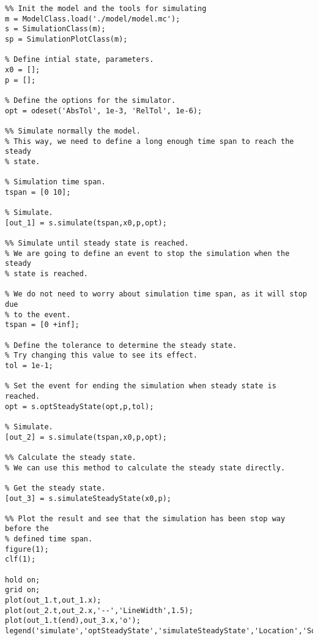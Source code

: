 \documentclass[11pt]{article}
\begin{document}
\begin{lstlisting}
%% Init the model and the tools for simulating
m = ModelClass.load('./model/model.mc');
s = SimulationClass(m);
sp = SimulationPlotClass(m);

% Define intial state, parameters.
x0 = [];
p = [];

% Define the options for the simulator.
opt = odeset('AbsTol', 1e-3, 'RelTol', 1e-6);

%% Simulate normally the model.
% This way, we need to define a long enough time span to reach the steady
% state.

% Simulation time span.
tspan = [0 10]; 

% Simulate.
[out_1] = s.simulate(tspan,x0,p,opt);

%% Simulate until steady state is reached.
% We are going to define an event to stop the simulation when the steady
% state is reached.

% We do not need to worry about simulation time span, as it will stop due
% to the event.
tspan = [0 +inf]; 

% Define the tolerance to determine the steady state.
% Try changing this value to see its effect.
tol = 1e-1;

% Set the event for ending the simulation when steady state is reached.
opt = s.optSteadyState(opt,p,tol);

% Simulate.
[out_2] = s.simulate(tspan,x0,p,opt);

%% Calculate the steady state.
% We can use this method to calculate the steady state directly.

% Get the steady state.
[out_3] = s.simulateSteadyState(x0,p);

%% Plot the result and see that the simulation has been stop way before the 
% defined time span.
figure(1);
clf(1);

hold on;
grid on;
plot(out_1.t,out_1.x);
plot(out_2.t,out_2.x,'--','LineWidth',1.5);
plot(out_1.t(end),out_3.x,'o');
legend('simulate','optSteadyState','simulateSteadyState','Location','SouthEast');
\end{lstlisting}
\end{document}
